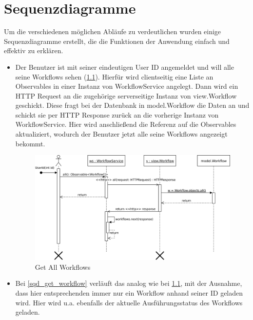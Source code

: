 \chapter{Sequenzdiagramme}
Um die verschiedenen möglichen Abläufe zu verdeutlichen wurden einige Sequenzdiagramme erstellt, die die Funktionen der Anwendung einfach und effektiv zu erklären.


\begin{itemize}


    \item Der Benutzer ist mit seiner eindeutigen User ID angemeldet und will alle seine Workflows sehen (\ref{sqd_get_all_workflows}). Hierfür wird clientseitig eine Liste an Observables in einer Instanz von WorkflowService angelegt. Dann wird ein HTTP Request an die zugehörige serverseitige Instanz von view.Workflow geschickt. Diese fragt bei der Datenbank in model.Workflow die Daten an und schickt sie per HTTP Response zurück an die vorherige Instanz von WorkflowService. Hier wird anschließend die Referenz auf die Observables aktualiziert, wodurch der Benutzer jetzt alle seine Workflows angezeigt bekommt. 
    
    \begin{figure}[h]
        \centering
        \includegraphics[width=15cm]{images/sqd_get_all_workflows.jpg}
        \caption{Get All Workflows}
        \label{sqd_get_all_workflows}
    \end{figure}
    
    \item     
    Bei \ref{sqd_get_workflow} verläuft das analog wie bei \ref{sqd_get_all_workflows}, mit der Ausnahme, dass hier entsprechenden immer nur ein Workflow anhand seiner ID geladen wird. Hier wird u.a. ebenfalls der aktuelle Ausführungsstatus des Workflows geladen.
    

\end{itemize}
